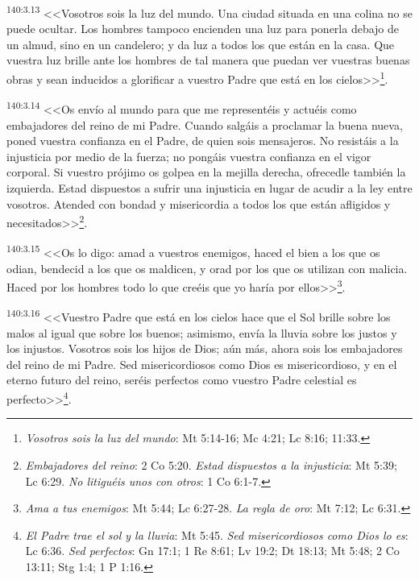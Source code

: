 \par 
\textsuperscript{140:3.13} <<Vosotros sois la luz del mundo. Una ciudad situada en una colina no se puede ocultar. Los hombres tampoco encienden una luz para ponerla debajo de un almud, sino en un candelero; y da luz a todos los que están en la casa. Que vuestra luz brille ante los hombres de tal manera que puedan ver vuestras buenas obras y sean inducidos a glorificar a vuestro Padre que está en los cielos>>\footnote{\textit{Vosotros sois la luz del mundo}: Mt 5:14-16; Mc 4:21; Lc 8:16; 11:33.}.

\par 
\textsuperscript{140:3.14} <<Os envío al mundo para que me representéis y actuéis como embajadores del reino de mi Padre. Cuando salgáis a proclamar la buena nueva, poned vuestra confianza en el Padre, de quien sois mensajeros. No resistáis a la injusticia por medio de la fuerza; no pongáis vuestra confianza en el vigor corporal. Si vuestro prójimo os golpea en la mejilla derecha, ofrecedle también la izquierda. Estad dispuestos a sufrir una injusticia en lugar de acudir a la ley entre vosotros. Atended con bondad y misericordia a todos los que están afligidos y necesitados>>\footnote{\textit{Embajadores del reino}: 2 Co 5:20. \textit{Estad dispuestos a la injusticia}: Mt 5:39; Lc 6:29. \textit{No litiguéis unos con otros}: 1 Co 6:1-7.}.

\par 
\textsuperscript{140:3.15} <<Os lo digo: amad a vuestros enemigos, haced el bien a los que os odian, bendecid a los que os maldicen, y orad por los que os utilizan con malicia. Haced por los hombres todo lo que creéis que yo haría por ellos>>\footnote{\textit{Ama a tus enemigos}: Mt 5:44; Lc 6:27-28. \textit{La regla de oro}: Mt 7:12; Lc 6:31.}.

\par 
\textsuperscript{140:3.16} <<Vuestro Padre que está en los cielos hace que el Sol brille sobre los malos al igual que sobre los buenos; asimismo, envía la lluvia sobre los justos y los injustos. Vosotros sois los hijos de Dios; aún más, ahora sois los embajadores del reino de mi Padre. Sed misericordiosos como Dios es misericordioso, y en el eterno futuro del reino, seréis perfectos como vuestro Padre celestial es perfecto>>\footnote{\textit{El Padre trae el sol y la lluvia}: Mt 5:45. \textit{Sed misericordiosos como Dios lo es}: Lc 6:36. \textit{Sed perfectos}: Gn 17:1; 1 Re 8:61; Lv 19:2; Dt 18:13; Mt 5:48; 2 Co 13:11; Stg 1:4; 1 P 1:16.}.

